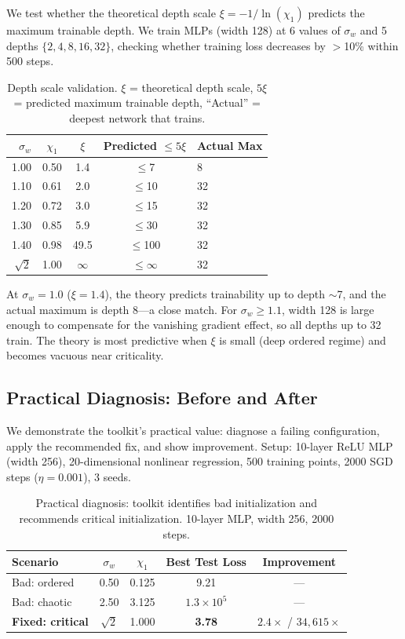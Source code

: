 \documentclass[10pt]{article}
\theoremstyle{definition}
\begin{document}
We test whether the theoretical depth scale $\xi = -1/\ln(\chi_1)$ predicts the maximum trainable depth.
We train MLPs (width 128) at 6 values of $\sigma_w$ and 5 depths $\{2, 4, 8, 16, 32\}$, checking whether training loss decreases by $>$10\% within 500 steps.

\begin{table}[t]
\centering
\caption{Depth scale validation. $\xi$ = theoretical depth scale, $5\xi$ = predicted maximum trainable depth, ``Actual'' = deepest network that trains.}
\label{tab:depth-scale}
\begin{tabular}{rcccl}
\toprule
$\sigma_w$ & $\chi_1$ & $\xi$ & Predicted $\leq 5\xi$ & Actual Max \\
\midrule
1.00 & 0.50 & 1.4 & $\leq$7 & 8 \\
1.10 & 0.61 & 2.0 & $\leq$10 & 32 \\
1.20 & 0.72 & 3.0 & $\leq$15 & 32 \\
1.30 & 0.85 & 5.9 & $\leq$30 & 32 \\
1.40 & 0.98 & 49.5 & $\leq$100 & 32 \\
$\sqrt{2}$ & 1.00 & $\infty$ & $\leq\infty$ & 32 \\
\bottomrule
\end{tabular}
\end{table}

At $\sigma_w = 1.0$ ($\xi = 1.4$), the theory predicts trainability up to depth $\sim$7, and the actual maximum is depth 8---a close match.
For $\sigma_w \geq 1.1$, width 128 is large enough to compensate for the vanishing gradient effect, so all depths up to 32 train.
The theory is most predictive when $\xi$ is small (deep ordered regime) and becomes vacuous near criticality.

\subsection{Practical Diagnosis: Before and After}
\label{sec:practical}

We demonstrate the toolkit's practical value: diagnose a failing configuration, apply the recommended fix, and show improvement.
Setup: 10-layer ReLU MLP (width 256), 20-dimensional nonlinear regression, 500 training points, 2000 SGD steps ($\eta = 0.001$), 3 seeds.

\begin{table}[t]
\centering
\caption{Practical diagnosis: toolkit identifies bad initialization and recommends critical initialization. 10-layer MLP, width 256, 2000 steps.}
\label{tab:practical}
\begin{tabular}{lcccc}
\toprule
Scenario & $\sigma_w$ & $\chi_1$ & Best Test Loss & Improvement \\
\midrule
Bad: ordered & 0.50 & 0.125 & 9.21 & --- \\
Bad: chaotic & 2.50 & 3.125 & $1.3 \times 10^5$ & --- \\
\textbf{Fixed: critical} & $\sqrt{2}$ & 1.000 & \textbf{3.78} & $2.4\times$ / $34{,}615\times$ \\
\bottomrule
\end{tabular}
\end{table}
\end{document}
